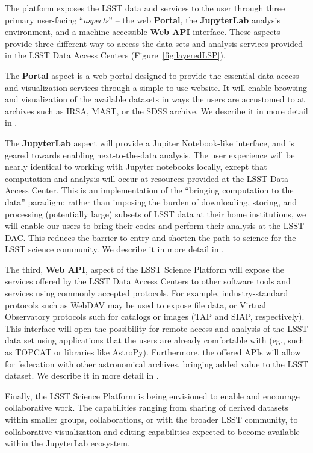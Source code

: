 \documentclass[DM,lsstdraft,toc]{lsstdoc}
\begin{document}
The platform exposes the LSST data
and services to the user through three primary user-facing ``{\it aspects}'' -- the web {\bf Portal},
the {\bf JupyterLab} analysis environment, and a machine-accessible {\bf Web API} interface. These aspects provide three different way to access the data sets and analysis services provided in the LSST Data Access Centers (Figure~\ref{fig:layeredLSP}).

The {\bf Portal} aspect is a web portal designed to provide the essential data
access and visualization services through a simple-to-use website.  It will
enable browsing and visualization of the available datasets in ways the
users are accustomed to at archives such as IRSA, MAST, or the SDSS archive.
We describe it in more detail in .

The {\bf JupyterLab} aspect will provide a Jupiter Notebook-like interface, and 
is geared towards enabling next-to-the-data analysis. The user experience will 
be nearly identical to working with Jupyter notebooks locally, except that computation
and analysis will occur at resources provided at the LSST Data Access Center.  This is an
implementation of the “bringing computation to the data” paradigm: rather
than imposing the burden of downloading, storing, and processing (potentially large)
subsets of LSST data at their home institutions, we will enable our users to
bring their codes and perform their analysis at the LSST DAC.
This reduces the barrier to entry and shorten the path to science for
the LSST science community. We describe it in more detail in .

The third, {\bf Web API}, aspect of the LSST Science Platform will expose the
services offered by the LSST Data Access Centers to other software tools and
services using commonly accepted protocols. For example, industry-standard
protocols such as WebDAV may be used to expose file data, or Virtual Observatory
protocols such for catalogs or images (TAP and SIAP, respectively). This interface will open the
possibility for remote access and analysis of the LSST  data set using
applications that the users are already comfortable with (eg., such as TOPCAT 
or libraries like AstroPy). Furthermore, the offered APIs will allow for federation
with other astronomical archives, bringing added value to the LSST dataset.
We describe it in more detail in .

Finally, the LSST Science Platform is being envisioned to enable and encourage
collaborative work.  The capabilities ranging from sharing of derived
datasets within smaller groups, collaborations, or with the broader LSST
community, to collaborative visualization and editing capabilities expected
to become available within the JupyterLab ecosystem.
\end{document}
